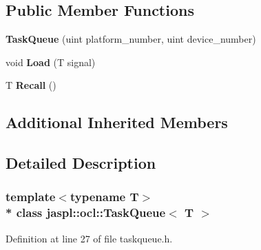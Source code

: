 \subsection*{Public Member Functions}
\begin{DoxyCompactItemize}
\item 
{\bfseries Task\+Queue} (uint platform\+\_\+number, uint device\+\_\+number)\hypertarget{classjaspl_1_1ocl_1_1_task_queue_a622e6d731766740b8fde66c1e5dcc05d}{}\label{classjaspl_1_1ocl_1_1_task_queue_a622e6d731766740b8fde66c1e5dcc05d}

\item 
void {\bfseries Load} (T signal)\hypertarget{classjaspl_1_1ocl_1_1_task_queue_a66c6ece3e07f7eff2036bf0392606a59}{}\label{classjaspl_1_1ocl_1_1_task_queue_a66c6ece3e07f7eff2036bf0392606a59}

\item 
T {\bfseries Recall} ()\hypertarget{classjaspl_1_1ocl_1_1_task_queue_aada14bbe200a4e949cb647a20c46f22a}{}\label{classjaspl_1_1ocl_1_1_task_queue_aada14bbe200a4e949cb647a20c46f22a}

\end{DoxyCompactItemize}
\subsection*{Additional Inherited Members}


\subsection{Detailed Description}
\subsubsection*{template$<$typename T$>$\\*
class jaspl\+::ocl\+::\+Task\+Queue$<$ T $>$}



Definition at line 27 of file taskqueue.\+h.

